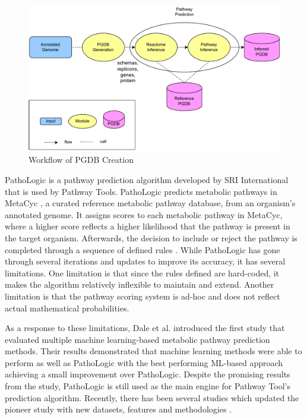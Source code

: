 \documentclass[sn-mathphys,Numbered]{sn-jnl}%
\theoremstyle{thmstyleone}%
\theoremstyle{thmstyletwo}%
\theoremstyle{thmstylethree}%
\begin{document}
\begin{figure}[ht]
\centering
\includegraphics[width=12cm]{test}
\caption{Workflow of PGDB Creation}
\label{fig:1}
\end{figure}

PathoLogic is a pathway prediction algorithm developed by SRI International that is used by Pathway Tools. 
PathoLogic predicts metabolic pathways in MetaCyc \cite{caspiMetaCycDatabaseMetabolic2020}, a curated reference metabolic pathway database, from an organism's annotated genome. %
It assigns scores to each metabolic pathway in MetaCyc, where a higher score reflects a higher likelihood that the pathway is present in the target organism. 
Afterwards, the decision to include or reject the pathway is completed through a sequence of defined rules \cite{karpPathwayToolsPathway2011}.  
While PathoLogic has gone through several iterations and updates to improve its accuracy, it has several limitations.
One limitation is that since the rules defined are hard-coded, it makes the algorithm relatively inflexible to maintain and extend.
Another limitation is that the pathway scoring system is ad-hoc and does not reflect actual mathematical probabilities.

As a response to these limitations, Dale et al. \cite{daleMachineLearningMethods2010} introduced the first study that evaluated multiple machine learning-based metabolic pathway prediction methods.
Their results demonstrated that machine learning methods were able to perform as well as PathoLogic with the best performing ML-based approach achieving a small improvement over PathoLogic. 
Despite the promising results from the study, PathoLogic is still used as the main engine for Pathway Tool’s prediction algorithm.
Recently, there has been several studies which updated the pioneer study with new datasets, features and methodologies \cite{m.a.basherMetabolicPathwayInference2020}\cite{aljarbouDeterminingPresenceMetabolic2020}\cite{shahDeepRFDeepLearning2022}.
\end{document}
